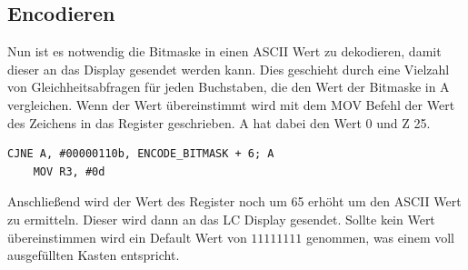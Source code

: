 \documentclass[a4paper,12pt]{article}
\begin{document}
	\subsection{Encodieren}
	Nun ist es notwendig die Bitmaske in einen ASCII Wert zu dekodieren, damit dieser an das Display gesendet werden kann. Dies geschieht durch eine Vielzahl von Gleichheitsabfragen für jeden Buchstaben, die den Wert der Bitmaske in A vergleichen. Wenn der Wert übereinstimmt wird mit dem MOV Befehl der Wert des Zeichens in das Register geschrieben. A hat dabei den Wert 0 und Z 25.
	\begin{lstlisting}[caption={Beispielhafte Gleihheitsabfrage für den Buchstaben A},captionpos=b]
	CJNE A, #00000110b, ENCODE_BITMASK + 6; A
	MOV R3, #0d
	\end{lstlisting}
	Anschließend wird der Wert des Register noch um 65 erhöht um den ASCII Wert zu ermitteln. Dieser wird dann an das LC Display gesendet. Sollte kein Wert übereinstimmen wird ein Default Wert von $11111111$ genommen, was einem voll ausgefüllten Kasten entspricht.
\end{document}
